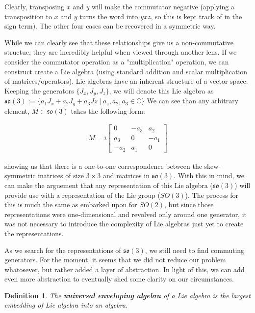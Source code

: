 \documentclass[10pt]{ucthesis}
\newcommand{\C}{\mathbb{C}}
\newtheorem{definition}{Definition}[chapter]
\begin{document}
Clearly, transposing $x$ and $y$ will make the commutator negative (applying a transposition to $x$ and $y$ turns the word into $yxz$, so this is kept track of in the sign term). The other four cases can be recovered in a symmetric way. \qedsymbol

While we can clearly see that these relationships give us a non-commutative structue, they are incredibly helpful when viewed through another lens. If we consider the commutator operation as a "multiplication" operation, we can construct create a Lie algebra (using standard addition and scalar multiplication of matrices/operators). Lie algebras have an inherent structure of a vector space. Keeping the generators $\{J_x,J_y,J_z\}$, we will denote this Lie algebra as $\mathfrak{so(3)} := \{a_1J_x + a_2J_y + a_3Jz \mid a_z,a_2,a_3\in\C\}$ We can see than any arbitrary element, $M\in \mathfrak{so(3)}$ takes the following form:

\begin{equation}
	\begin{aligned}
		M=i\begin{bmatrix}
		0 & -a_3 & a_2 \\
		 a_3 & 0 & -a_1\\
		-a_2 & a_1 & 0
		\end{bmatrix}
	\end{aligned}
\end{equation} 

showing us that there is a one-to-one correspondence between the skew-symmetric matrices of size $3\times 3$ and matrices in $\mathfrak{so(3)}$. With this in mind, we can make the arguement that any representation of this Lie algebra ($\mathfrak{so(3)}$) will provide use with a representation of the Lie group ($SO(3)$). The process for this is much the same as embarked upon for $SO(2)$, but since those representations were one-dimensional and revolved only around one generator, it was not necessary to introduce the complexity of Lie algebras just yet to create the representations. 

As we search for the representations of $\mathfrak{so(3)}$, we still need to find commuting generators. For the moment, it seems that we did not reduce our problem whatosever, but rather added a layer of abstraction. In light of this, we can add even more abstraction to eventually shed some clarity on our circumstances.

\begin{definition}
	The \textbf{universal enveloping algebra} of a Lie algebra is the largest embedding of Lie algebra into an algebra. 
\end{definition}
\end{document}
